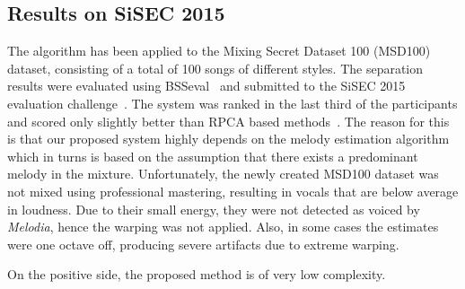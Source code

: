 
\subsection{Results on SiSEC 2015}
\label{ssec:performance_sisec15}

The algorithm has been applied to the Mixing Secret Dataset 100 (MSD100) dataset,  consisting of a total of 100 songs of different styles.
The separation results were evaluated using BSSeval~\cite{fevotte05} and submitted to the SiSEC 2015 evaluation challenge~\cite{ono15}.
The system was ranked in the last third of the participants and scored only slightly better than RPCA based methods~\cite{huang12}.
The reason for this is that our proposed system highly depends on the melody estimation algorithm which in turns is based on the assumption that there exists a predominant melody in the mixture.
Unfortunately, the newly created MSD100 dataset was not mixed using professional mastering, resulting in vocals that are below average in loudness.
Due to their small energy, they were not detected as voiced by \emph{Melodia}, hence the warping was not applied. Also, in some cases the estimates were one octave off, producing severe artifacts due to extreme warping.\par
On the positive side, the proposed method is of very low complexity.


